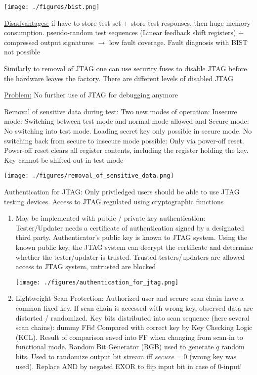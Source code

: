 \documentclass[landscape, a4paper]{article}
\begin{document}
\begin{minipage}[t]{0.2\linewidth}
\begin{betterlist}
\begin{enumerate}
\begin{betterlist}
				\texttt{[image: ./figures/bist.png]}
				\item Similarly to removal of JTAG one can use security fuses to disable JTAG before the hardware leaves the factory. There are different levels of disabled JTAG
				\item \underline{Problem:} No further use of JTAG for debugging anymore
			\end{betterlist}
			\item \alert{Removal of sensitive data during test:} Two new modes of operation: \alert{Insecure mode:} Switching between test mode and normal mode allowed and \alert{Secure mode:} No switching into test mode. Loading secret key only possible in secure mode. No switching back from secure to insecure mode possible: Only via power-off reset. Power-off reset clears all register contents, including the register holding the key. Key cannot be shifted out in test mode

			\texttt{[image: ./figures/removal\_of\_sensitive\_data.png]}
			\item \alert{Authentication for JTAG:} Only priviledged users should be able to use JTAG testing devices. Access to JTAG regulated using cryptographic functions
			\begin{enumerate}
				\item May be implemented with public / private key authentication: Tester/Updater needs a certificate of authentication signed by a designated third party. Authenticator’s public key is known to JTAG system. Using the known public key, the JTAG system can decrypt the certificate and determine whether the tester/updater is trusted. Trusted testers/updaters are allowed access to JTAG system, untrusted are blocked

				\texttt{[image: ./figures/authentication\_for\_jtag.png]}
				\item \alert{Lightweight Scan Protection:} Authorized user and secure scan chain have a common fixed key. If scan chain is accessed with wrong key, observed data are distorted / randomized. Key bits distributed into scan sequence (here several scan chains): dummy FFs! Compared with correct key by Key Checking Logic (KCL). Result of comparison saved into FF when changing from scan-in to functional mode. Random Bit Generator (RGB) used to generate $q$ random bits. Used to randomize output bit stream iff $secure = 0$ (wrong key was used). Replace AND by negated EXOR to flip input bit in case of $0$-input!


\end{enumerate}
\end{enumerate}
\end{betterlist}
\end{minipage}
\end{document}
